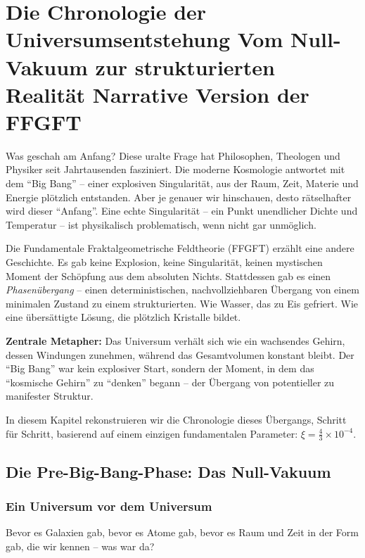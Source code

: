 \chapter{Die Chronologie der Universumsentstehung  Vom Null-Vakuum zur strukturierten Realität  Narrative Version der FFGFT}


	
	Was geschah am Anfang? Diese uralte Frage hat Philosophen, Theologen und Physiker seit Jahrtausenden fasziniert. Die moderne Kosmologie antwortet mit dem \enquote{Big Bang} -- einer explosiven Singularität, aus der Raum, Zeit, Materie und Energie plötzlich entstanden. Aber je genauer wir hinschauen, desto rätselhafter wird dieser \enquote{Anfang}. Eine echte Singularität -- ein Punkt unendlicher Dichte und Temperatur -- ist physikalisch problematisch, wenn nicht gar unmöglich.
	
	Die Fundamentale Fraktalgeometrische Feldtheorie (FFGFT) erzählt eine andere Geschichte. Es gab keine Explosion, keine Singularität, keinen mystischen Moment der Schöpfung aus dem absoluten Nichts. Stattdessen gab es einen \textit{Phasenübergang} -- einen deterministischen, nachvollziehbaren Übergang von einem minimalen Zustand zu einem strukturierten. Wie Wasser, das zu Eis gefriert. Wie eine übersättigte Lösung, die plötzlich Kristalle bildet.
	
	\textbf{Zentrale Metapher:} Das Universum verhält sich wie ein wachsendes Gehirn, dessen Windungen zunehmen, während das Gesamtvolumen konstant bleibt. Der \enquote{Big Bang} war kein explosiver Start, sondern der Moment, in dem das \enquote{kosmische Gehirn} zu \enquote{denken} begann -- der Übergang von potentieller zu manifester Struktur.
	
	In diesem Kapitel rekonstruieren wir die Chronologie dieses Übergangs, Schritt für Schritt, basierend auf einem einzigen fundamentalen Parameter: $\xi = \frac{4}{3} \times 10^{-4}$.
	
	\section{Die Pre-Big-Bang-Phase: Das Null-Vakuum}
	
	\subsection{Ein Universum vor dem Universum}
	
	Bevor es Galaxien gab, bevor es Atome gab, bevor es Raum und Zeit in der Form gab, die wir kennen -- was war da?
	
